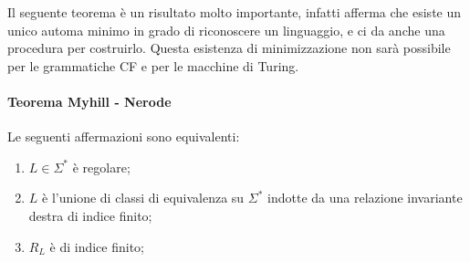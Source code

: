 \documentclass[a4paper, 10pt]{report}
\begin{document}
\noindent Il seguente teorema è un risultato molto importante, infatti afferma che esiste un unico automa minimo in grado di riconoscere un linguaggio, e ci da anche una procedura per costruirlo. Questa esistenza di minimizzazione non sarà possibile per le grammatiche CF e per le macchine di Turing. 

\paragraph*{Teorema Myhill - Nerode}
	Le seguenti affermazioni sono equivalenti:
	\begin{enumerate}
		\item $L \in \Sigma^*$ è regolare;
		\item $L$ è l'unione di classi di equivalenza su $\Sigma^*$ indotte da una relazione invariante destra di indice finito;
		\item $R_L$ è di indice finito;
	\end{enumerate}
\end{document}
